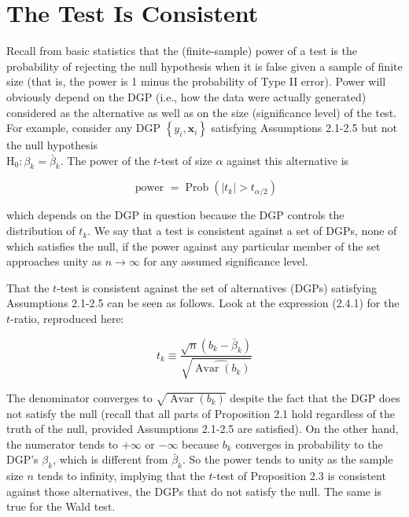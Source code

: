 \documentclass[10pt]{article}
\begin{document}
\section*{The Test Is Consistent}
Recall from basic statistics that the (finite-sample) power of a test is the probability of rejecting the null hypothesis when it is false given a sample of finite size (that is, the power is 1 minus the probability of Type II error). Power will obviously depend on the DGP (i.e., how the data were actually generated) considered as the alternative as well as on the size (significance level) of the test. For example, consider any DGP $\left\{y_{i}, \mathbf{x}_{i}\right\}$ satisfying Assumptions 2.1-2.5 but not the null hypothesis\\
$\mathrm{H}_{0}: \beta_{k}=\bar{\beta}_{k}$. The power of the $t$-test of size $\alpha$ against this alternative is

$$
\text { power }=\operatorname{Prob}\left(\left|t_{k}\right|>t_{\alpha / 2}\right)
$$

which depends on the DGP in question because the DGP controls the distribution of $t_{k}$. We say that a test is consistent against a set of DGPs, none of which satisfies the null, if the power against any particular member of the set approaches unity as $n \rightarrow \infty$ for any assumed significance level.

That the $t$-test is consistent against the set of alternatives (DGPs) satisfying Assumptions 2.1-2.5 can be seen as follows. Look at the expression (2.4.1) for the $t$-ratio, reproduced here:

$$
t_{k} \equiv \frac{\sqrt{n}\left(b_{k}-\bar{\beta}_{k}\right)}{\sqrt{\widehat{\operatorname{Avar}\left(b_{k}\right)}}}
$$

The denominator converges to $\sqrt{\operatorname{Avar}\left(b_{k}\right)}$ despite the fact that the DGP does not satisfy the null (recall that all parts of Proposition 2.1 hold regardless of the truth of the null, provided Assumptions 2.1-2.5 are satisfied). On the other hand, the numerator tends to $+\infty$ or $-\infty$ because $b_{k}$ converges in probability to the DGP's $\beta_{k}$, which is different from $\bar{\beta}_{k}$. So the power tends to unity as the sample size $n$ tends to infinity, implying that the $t$-test of Proposition 2.3 is consistent against those alternatives, the DGPs that do not satisfy the null. The same is true for the Wald test.
\end{document}
